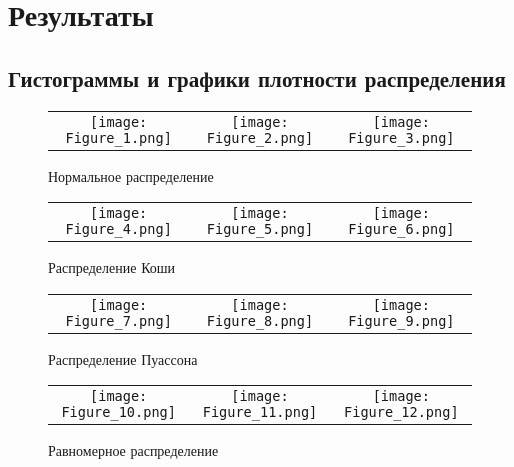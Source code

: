 \documentclass[a4paper]{article}
\begin{document}
\section {Результаты} 

\subsection{Гистограммы и графики плотности распределения}
	\begin{figure}[H]
		\centering
		\begin{tabular}{ccc}
			\texttt{[image: Figure\_1.png]}
			&
			\texttt{[image: Figure\_2.png]}
			&
			\texttt{[image: Figure\_3.png]}
		\end{tabular}
		\caption{Нормальное распределение} 
	\end{figure}

	\begin{figure}[H]
		\centering
		\begin{tabular}{ccc}
			\texttt{[image: Figure\_4.png]}
			&
			\texttt{[image: Figure\_5.png]}
			&
			\texttt{[image: Figure\_6.png]}
		\end{tabular}
		\caption{Распределение Коши}
		\label{fig:cauchy}
	\end{figure}

	\begin{figure}[H]
		\centering
		\begin{tabular}{ccc}
			\texttt{[image: Figure\_7.png]}
			&
			\texttt{[image: Figure\_8.png]}
			&
			\texttt{[image: Figure\_9.png]}
		\end{tabular}
		\caption{Распределение Пуассона}
		\label{fig:poisson}
	\end{figure}

	\begin{figure}[H]
		\centering
		\begin{tabular}{ccc}
			\texttt{[image: Figure\_10.png]}
			&
			\texttt{[image: Figure\_11.png]}
			&
			\texttt{[image: Figure\_12.png]}
		\end{tabular}
		\caption{Равномерное распределение}
		\label{fig:uniform}
	\end{figure}
\end{document}
